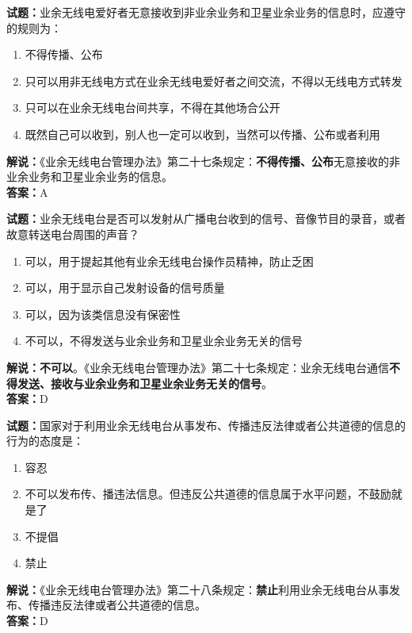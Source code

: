 \documentclass{ctexbook}
\begin{document}
\bigskip

\noindent\textbf{试题：}业余无线电爱好者无意接收到非业余业务和卫星业余业务的信息时，应遵守的规则为：
\begin{enumerate}[leftmargin=3em]
  \item 不得传播、公布
  \item 只可以用非无线电方式在业余无线电爱好者之间交流，不得以无线电方式转发
  \item 只可以在业余无线电台间共享，不得在其他场合公开
  \item 既然自己可以收到，别人也一定可以收到，当然可以传播、公布或者利用
\end{enumerate}
\noindent\textbf{解说：}《业余无线电台管理办法》第二十七条规定：\textbf{不得传播、公布}无意接收的非业余业务和卫星业余业务的信息。\\\noindent\textbf{答案：}A

\bigskip

\noindent\textbf{试题：}业余无线电台是否可以发射从广播电台收到的信号、音像节目的录音，或者故意转送电台周围的声音？
\begin{enumerate}[leftmargin=3em]
  \item 可以，用于提起其他有业余无线电台操作员精神，防止乏困
  \item 可以，用于显示自己发射设备的信号质量
  \item 可以，因为该类信息没有保密性
  \item 不可以，不得发送与业余业务和卫星业余业务无关的信号
\end{enumerate}
\textbf{解说：不可以}。《业余无线电台管理办法》第二十七条规定：业余无线电台通信\textbf{不得发送、接收与业余业务和卫星业余业务无关的信号}。\\\noindent\textbf{答案：}D

\bigskip

\noindent\textbf{试题：}国家对于利用业余无线电台从事发布、传播违反法律或者公共道德的信息的行为的态度是：
\begin{enumerate}[leftmargin=3em]
  \item 容忍
  \item 不可以发布传、播违法信息。但违反公共道德的信息属于水平问题，不鼓励就是了
  \item 不提倡
  \item 禁止
\end{enumerate}
\noindent\textbf{解说：}《业余无线电台管理办法》第二十八条规定：\textbf{禁止}利用业余无线电台从事发布、传播违反法律或者公共道德的信息。\\\noindent\textbf{答案：}D
\end{document}
